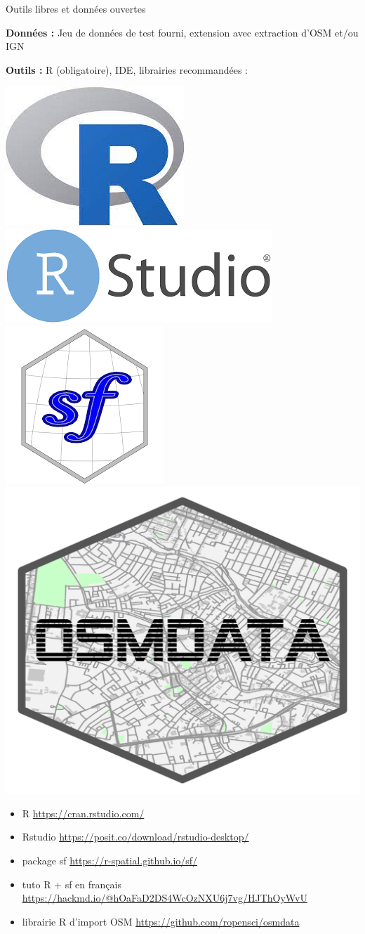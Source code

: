 \documentclass[9pt]{beamer}
\begin{document}
\begin{frame}{Outils libres et données ouvertes}


\textbf{Données :} Jeu de données de test fourni, extension avec extraction d'OSM et/ou IGN \\ 

\vspace{0.5cm}

 \textbf{Outils :} R (obligatoire), IDE, librairies recommandées :



\begin{center}
\includegraphics[height=0.1\textwidth]{ressources/images/rlogo.jpg} 
\includegraphics[height=0.1\textwidth]{ressources/images/rstudio.png}  
\includegraphics[height=0.1\textwidth]{ressources/images/sf_logo.png} 
\includegraphics[height=0.1\textwidth]{ressources/images/logo_osmdata.png} 
\end{center}

\vspace{0.9cm}

\begin{scriptsize}
\begin{itemize}
\item R \url{https://cran.rstudio.com/}
\item Rstudio \url{https://posit.co/download/rstudio-desktop/}
\item package sf \url{https://r-spatial.github.io/sf/}
\item tuto R  + sf en français \url{https://hackmd.io/@hOaFaD2DS4WcOzNXU6j7vg/HJThOyWvU}
\item librairie R d'import OSM  \url{https://github.com/ropensci/osmdata}
\end{itemize}
\end{scriptsize}

\end{frame}
\end{document}
